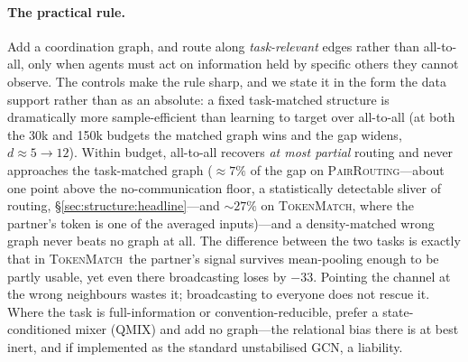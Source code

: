 \documentclass[10pt]{article}
\newcommand{\algoname}[1]{\textsc{#1}}
\newcommand{\qmix}{\algoname{QMIX}}
\newcommand{\pairrouting}{\textsc{PairRouting}}
\newcommand{\tokenmatch}{\textsc{TokenMatch}}
\begin{document}
\paragraph{The practical rule.} Add a coordination graph, and route along
\emph{task-relevant} edges rather than all-to-all, only when agents must act
on information held by specific others they cannot observe. The controls make
the rule sharp, and we state it in the form the data support rather than as an
absolute: a fixed task-matched structure is dramatically more sample-efficient
than learning to target over all-to-all (at both the 30k and 150k budgets the
matched graph wins and the gap widens, $d{\approx}5\!\to\!12$). Within budget,
all-to-all recovers
\emph{at most partial} routing and never approaches the task-matched graph
(${\approx}7\%$ of the gap on \pairrouting---about one point above the
no-communication floor, a statistically detectable sliver of routing,
\S\ref{sec:structure:headline}---and ${\sim}27\%$ on \tokenmatch, where the
partner's token is one of the averaged
inputs)---and a density-matched wrong graph never beats no graph at all. The
difference between the two tasks is exactly that in \tokenmatch\ the partner's
signal survives mean-pooling enough to be partly usable, yet even there
broadcasting loses by $-33$. Pointing the channel at the wrong neighbours wastes
it; broadcasting to everyone does not rescue it. Where the
task is full-information or convention-reducible, prefer a state-conditioned
mixer (\qmix) and add no graph---the relational bias there is at best inert,
and if implemented as the standard unstabilised GCN, a liability.
\end{document}
